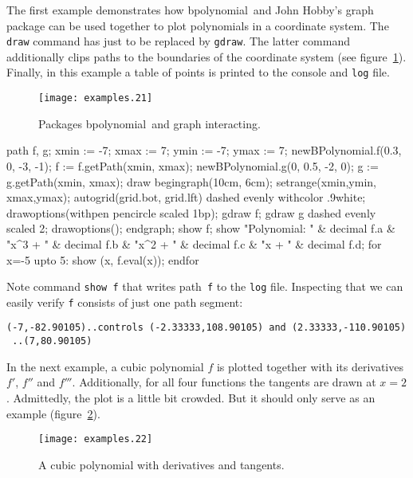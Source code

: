 \documentclass{article}
\newcommand*{\cmd}[1]{\texttt{#1}}
\newcommand*{\name}[1]{\textsf{#1}}
\newcommand*{\pkg}{\name{bpolynomial}}
\begin{document}
The first example demonstrates how \pkg\ and John Hobby's \name{graph} package\cite{mp:graph} can be used together to plot polynomials in a coordinate system.  The \cmd{draw} command has just to be replaced by \cmd{gdraw}.  The latter command additionally clips paths to the boundaries of the coordinate system (see figure~\ref{fig:graph.mp}).  Finally, in this example a table of points is printed to the console and \cmd{log} file.

\begin{figure}
  \centering
  \texttt{[image: examples.21]}
  \caption{Packages \pkg\ and \name{graph} interacting.}
  \label{fig:graph.mp}
\end{figure}

\begin{listing}
path f, g;
  xmin := -7; xmax := 7;
  ymin := -7; ymax := 7;
  newBPolynomial.f(0.3, 0, -3, -1);
  f := f.getPath(xmin, xmax);
  newBPolynomial.g(0, 0.5, -2, 0);
  g := g.getPath(xmin, xmax);
  draw begingraph(10cm, 6cm);
    setrange(xmin,ymin, xmax,ymax);
    autogrid(grid.bot, grid.lft) dashed evenly withcolor .9white;
    drawoptions(withpen pencircle scaled 1bp);
    gdraw f;
    gdraw g dashed evenly scaled 2;
    drawoptions();
  endgraph;
  show f;
  show "Polynomial: " & decimal f.a & "x^3 + " &
    decimal f.b & "x^2 + " & decimal f.c & "x + " & decimal f.d;
  for x=-5 upto 5:
    show (x, f.eval(x));
  endfor
\end{listing}

Note command \cmd{show f} that writes path~\cmd{f} to the \cmd{log} file.  Inspecting that we can easily verify \cmd{f} consists of just one path segment:
\begingroup\small
\begin{verbatim}
(-7,-82.90105)..controls (-2.33333,108.90105) and (2.33333,-110.90105)
 ..(7,80.90105)
\end{verbatim}
\endgroup

In the next example, a cubic polynomial $f$ is plotted together with its derivatives $f'$, $f''$ and $f'''$.  Additionally, for all four functions the tangents are drawn at $x=2$.  Admittedly, the plot is a little bit crowded.  But it should only serve as an example (figure~\ref{fig:derivatives}).

\begin{figure}
  \centering
  \texttt{[image: examples.22]}
  \caption{A cubic polynomial with derivatives and tangents.}
  \label{fig:derivatives}
\end{figure}
\end{document}
